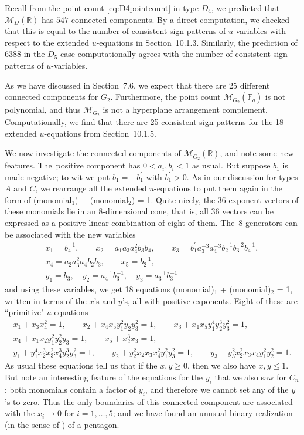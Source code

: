 \documentclass[10pt,a4paper]{amsart}
\def\R{{\mathbb R}}
\def\F{{\mathbb F}}
\def\M{{\mathcal{M}}}
\numberwithin{equation}{section}
\begin{document}
Recall from the point count \eqref{eq:D4pointcount} in type $D_4$, we predicted that $\M_D(\R)$ has $547$ connected components. By a direct computation, we checked that this is equal to the number of consistent sign patterns of $u$-variables with respect to the extended $u$-equations in Section~10.1.3. Similarly, the prediction of $6388$ in the $D_5$ case computationally agrees with the number of consistent sign patterns of $u$-variables.

\bigskip{}
As we have discussed in Section~7.6, we expect that there are 25 different connected components for $G_2$. Furthermore, the point count $\M_{G_2}(\F_q)$ is not polynomial, and thus $\M_{G_2}$ is not a hyperplane arrangement complement. Computationally, we find that there are 25 consistent sign patterns for the 18 extended $u$-equations from Section~10.1.5.

We now investigate the connected components of $\M_{G_2}(\R)$, and note some new features. The~positive component has $0 < a_i, b_i < 1$ as usual. But suppose $b_1$ is made negative; to wit we put $b_1 = -b^\prime_1$ with $b^\prime_1 > 0$. As in our discussion for types $A$ and $C$, we rearrange all the extended $u$-equations to put them again in the form of (monomial$_1$) + (monomial$_2$) = 1. Quite nicely, the 36 exponent vectors of these monomials lie in an 8-dimensional cone, that is, all 36 vectors can be expressed as a positive linear combination of eight of them. The~8 generators can be associated with the new variables
\begin{gather*}
x_1 = b_4^{-1},\qquad x_2=a_1a_3 a_4^2 b_3 b_4,\qquad x_3 = b^\prime_1 a_3^{-3} a_4^{-3} b_2^{-1} b_3^{-2} b_4^{-1},
\\
x_4=a_2 a_3^2 a_4 b_2 b_3,\qquad x_5 =b_2^{-1},
\\
y_1=b_3, \quad
 y_2= a_4^{-1} b_3^{-1}, \quad y_3=a_3^{-1} b_3^{-1}
\end{gather*}
and using these variables, we get 18 equations (monomial)$_1$ + (monomial)$_2$ = 1, written in terms of the $x$'s and $y$'s, all with positive exponents. Eight of these are ``primitive" $u$-equations
\begin{gather*}
x_1 + x_3 x_4^2=1, \qquad
x_2 + x_4 x_5 y_1^2 y_2 y_3^2=1, \qquad
x_3 + x_1 x_5 y_1^4 y_2^3 y_3^2=1,
\\
x_4 + x_1 x_2 y_1^2 y_2^2 y_3=1, \qquad
x_5 + x_2^3 x_3=1,
\\[.5ex]
y_1 + y_1^4 x_2^3 x_3^2 x_4^3 y_2^3 y_3^2=1, \qquad
y_2 + y_2^2 x_2 x_3 x_4^2 y_1^2 y_3^2=1, \qquad
y_3 + y_3^2 x_2^2 x_3 x_4 y_1^2 y_2^2=1.
\end{gather*}
 As usual these equations tell us that if the $x,y \geq 0$, then we also have $x, y \leq 1$. But note an interesting feature of the equations for the $y_i$ that we also saw for $C_n$: both monomials contain a factor of $y_i$, and therefore we cannot set any of the $y$'s to zero. Thus the only boundaries of this connected component are associated with the $x_{i} \to 0$ for $i =1,\dots,5$; and we have found an unusual binary realization (in the sense of \cite{AHLT}) of a pentagon.
\end{document}

